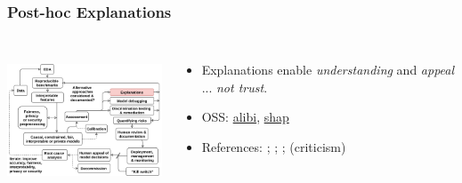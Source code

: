 \documentclass[11pt,
               aspectratio=169,
               hyperref={colorlinks}
               ]{beamer}
\begin{document}
			\begin{frame}
		
				\frametitle{Post-hoc Explanations}		
			
				\begin{columns}
	
					\centering
					\includegraphics[height=120pt]{../img/exp.png}
				
					\vspace{-5pt}
					
					\small{
					\begin{itemize}
						\item Explanations enable \textit{understanding} and \textit{appeal} ... \textit{not trust}.
						\item OSS: \href{https://github.com/SeldonIO/alibi}{alibi}, \href{https://github.com/slundberg/shap}{shap} 
						\item References: ; ; ;  (criticism)
					\end{itemize}}
				
				\end{columns}
		
			\end{frame}
	
\end{document}
